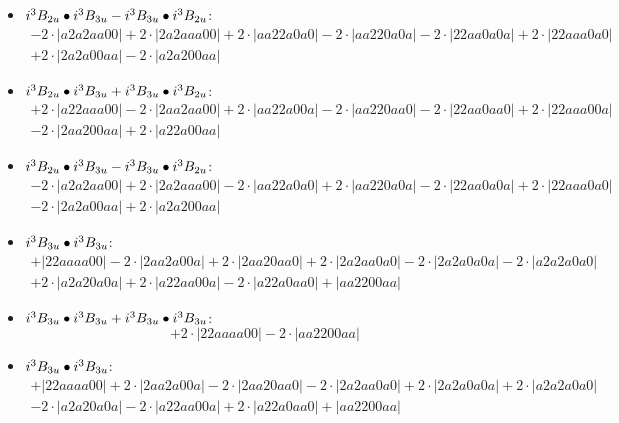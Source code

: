 \documentclass{article}
\begin{document}
\begin{itemize}
$$\begin{array}{c}
\end{array}$$
\item \boldmath$i^3 B_{2u} \bullet i^3 B_{3u} - i^3 B_{3u} \bullet i^3 B_{2u} \displaystyle $\unboldmath : \quad$$\begin{array}{c}
-2 \cdot \left|a2a2aa00\right| +2 \cdot \left|2a2aaa00\right| +2 \cdot \left|aa22a0a0\right| -2 \cdot \left|aa220a0a\right| -2 \cdot \left|22aa0a0a\right| +2 \cdot \left|22aaa0a0\right| \\[0.5cm] +2 \cdot \left|2a2a00aa\right| -2 \cdot \left|a2a200aa\right|
\end{array}$$
\item \boldmath$i^3 B_{2u} \bullet i^3 B_{3u} + i^3 B_{3u} \bullet i^3 B_{2u} \displaystyle $\unboldmath : \quad$$\begin{array}{c}
+2 \cdot \left|a22aaa00\right| -2 \cdot \left|2aa2aa00\right| +2 \cdot \left|aa22a00a\right| -2 \cdot \left|aa220aa0\right| -2 \cdot \left|22aa0aa0\right| +2 \cdot \left|22aaa00a\right| \\[0.5cm] -2 \cdot \left|2aa200aa\right| +2 \cdot \left|a22a00aa\right|
\end{array}$$
\item \boldmath$i^3 B_{2u} \bullet i^3 B_{3u} - i^3 B_{3u} \bullet i^3 B_{2u} \displaystyle $\unboldmath : \quad$$\begin{array}{c}
-2 \cdot \left|a2a2aa00\right| +2 \cdot \left|2a2aaa00\right| -2 \cdot \left|aa22a0a0\right| +2 \cdot \left|aa220a0a\right| -2 \cdot \left|22aa0a0a\right| +2 \cdot \left|22aaa0a0\right| \\[0.5cm] -2 \cdot \left|2a2a00aa\right| +2 \cdot \left|a2a200aa\right|
\end{array}$$
\item \boldmath$i^3 B_{3u} \bullet i^3 B_{3u} \displaystyle $\unboldmath : \quad$$\begin{array}{c}
+\left|22aaaa00\right| -2 \cdot \left|2aa2a00a\right| +2 \cdot \left|2aa20aa0\right| +2 \cdot \left|2a2aa0a0\right| -2 \cdot \left|2a2a0a0a\right| -2 \cdot \left|a2a2a0a0\right| \\[0.5cm] +2 \cdot \left|a2a20a0a\right| +2 \cdot \left|a22aa00a\right| -2 \cdot \left|a22a0aa0\right| +\left|aa2200aa\right|
\end{array}$$
\item \boldmath$i^3 B_{3u} \bullet i^3 B_{3u} + i^3 B_{3u} \bullet i^3 B_{3u} \displaystyle $\unboldmath : \quad$$+2 \cdot \left|22aaaa00\right| -2 \cdot \left|aa2200aa\right|$$
\item \boldmath$i^3 B_{3u} \bullet i^3 B_{3u} \displaystyle $\unboldmath : \quad$$\begin{array}{c}
+\left|22aaaa00\right| +2 \cdot \left|2aa2a00a\right| -2 \cdot \left|2aa20aa0\right| -2 \cdot \left|2a2aa0a0\right| +2 \cdot \left|2a2a0a0a\right| +2 \cdot \left|a2a2a0a0\right| \\[0.5cm] -2 \cdot \left|a2a20a0a\right| -2 \cdot \left|a22aa00a\right| +2 \cdot \left|a22a0aa0\right| +\left|aa2200aa\right|
\end{array}$$

\end{itemize}
\end{document}
